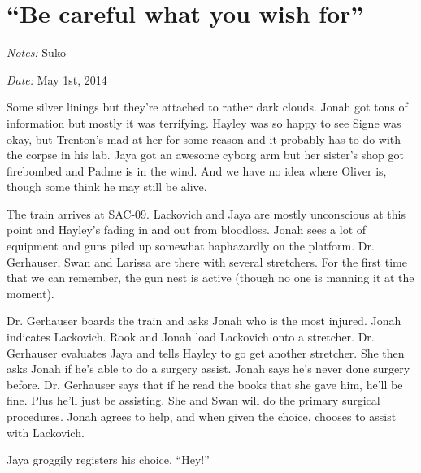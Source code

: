 \setcounter{chapter}{ 23 }
\chapter{\textbf{``Be careful what you wish for''} }







\textit{Notes:} Suko

\textit{Date:} May 1st, 2014



Some silver linings but they're attached to rather dark clouds.  Jonah got tons of information but mostly it was terrifying. Hayley was so happy to see Signe was okay, but Trenton's mad at her for some reason and it probably has to do with the corpse in his lab.  Jaya got an awesome cyborg arm but her sister's shop got firebombed and Padme is in the wind.  And we have no idea where Oliver is, though some think he may still be alive.



\noindent\hrulefill








The train arrives at SAC-09.  Lackovich and Jaya are mostly unconscious at this point and Hayley's fading in and out from bloodloss.  Jonah sees a lot of equipment and guns piled up somewhat haphazardly on the platform. Dr. Gerhauser, Swan and Larissa are there with several stretchers.  For the first time that we can remember, the gun nest is active (though no one is manning it at the moment).



Dr. Gerhauser boards the train and asks Jonah who is the most injured.  Jonah indicates Lackovich.  Rook and Jonah load Lackovich onto a stretcher.  Dr. Gerhauser evaluates Jaya and tells Hayley to go get another stretcher.  She then asks Jonah if he's able to do a surgery assist.  Jonah says he's never done surgery before.  Dr. Gerhauser says that if he read the books that she gave him, he'll be fine.  Plus he'll just be assisting.  She and Swan will do the primary surgical procedures.  Jonah agrees to help, and when given the choice, chooses to assist with Lackovich.

Jaya groggily registers his choice. ``Hey!''


